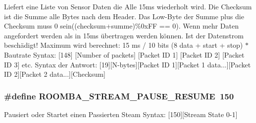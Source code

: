 Liefert eine Liste von Sensor Daten die Alle 15ms wiederholt wird. Die Checksum ist die Summe alle Bytes nach dem Header. Das Low-\/\-Byte der Summe plus die Checksum muss 0 sein((checksum+summe)\%0x\-F\-F == 0). Wenn mehr Daten angefordert werden als in 15ms übertragen werden können. Ist der Datenstrom beschädigt! Maximum wird berechnet\-: 15 ms / 10 bits (8 data + start + stop) $\ast$ Bautrate Syntax\-: \mbox{[}148\mbox{]} \mbox{[}Number of packets\mbox{]} \mbox{[}Packet I\-D 1\mbox{]} \mbox{[}Packet I\-D 2\mbox{]} \mbox{[}Packet I\-D 3\mbox{]} etc. Syntax der Antwort\-: \mbox{[}19\mbox{]}\mbox{[}N-\/bytes\mbox{]}\mbox{[}Packet I\-D 1\mbox{]}\mbox{[}Packet 1 data...\mbox{]}\mbox{[}Packet I\-D 2\mbox{]}\mbox{[}Packet 2 data...\mbox{]}\mbox{[}Checksum\mbox{]} \hypertarget{group__roomba__commands__sensor_ga6389061ebdb4feec1198ea5c4f6fae55}{
\subsubsection[{R\-O\-O\-M\-B\-A\-\_\-\-S\-T\-R\-E\-A\-M\-\_\-\-P\-A\-U\-S\-E\-\_\-\-R\-E\-S\-U\-M\-E}]{\setlength{\rightskip}{0pt plus 5cm}\#define R\-O\-O\-M\-B\-A\-\_\-\-S\-T\-R\-E\-A\-M\-\_\-\-P\-A\-U\-S\-E\-\_\-\-R\-E\-S\-U\-M\-E~150}}\label{group__roomba__commands__sensor_ga6389061ebdb4feec1198ea5c4f6fae55}
Pausiert oder Startet einen Passierten Steam Syntax\-: \mbox{[}150\mbox{]}\mbox{[}Stream State 0-\/1\mbox{]} 
